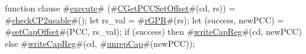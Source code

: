 function clause #\hyperref[zexecute]{execute}# (#\hyperref[zCGetPCCSetOffset]{CGetPCCSetOffset}#(cd, rs)) =
{
  #\hyperref[zcheckCP2usable]{checkCP2usable}#();
  let rs_val = #\hyperref[zrGPR]{rGPR}#(rs);
  let (success, newPCC) = #\hyperref[zsetCapOffset]{setCapOffset}#(PCC, rs_val);
  if (success) then
    #\hyperref[zwriteCapReg]{writeCapReg}#(cd, newPCC)
  else
    #\hyperref[zwriteCapReg]{writeCapReg}#(cd, #\hyperref[zunrepCap]{unrepCap}#(newPCC));
}
